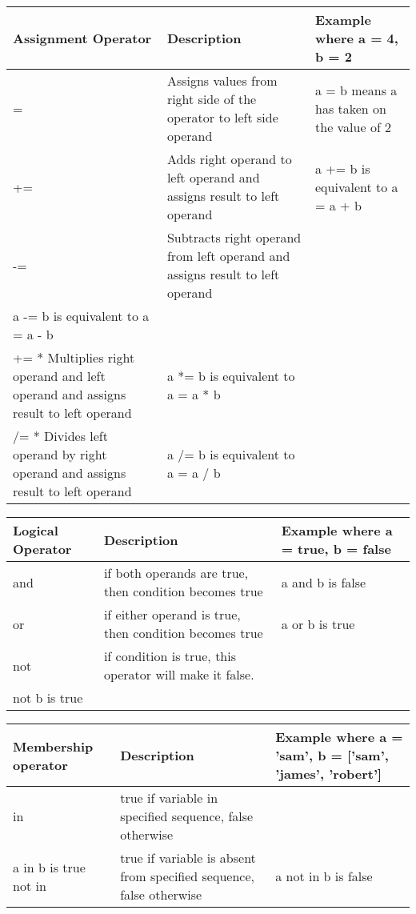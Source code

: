 \begin{center}
    \begin{tabular}{| l | l | l |}
    \hline
    Assignment Operator & Description & Example where a = 4, b = 2 \\ \hline
    = & Assigns values from right side of the operator to left side operand & a = b means a has taken on the value of 2 \\ \hline
    += & Adds right operand to left operand and assigns result to left operand & a += b is equivalent to a = a + b\\ \hline
    -= & Subtracts right operand from left operand and assigns result to left operand \\ a -= b is equivalent to a = a - b \\ \hline
    += * Multiplies right operand and left operand and assigns result to left operand & a *= b is equivalent to a = a * b\\ \hline
    /= * Divides left operand by right operand and assigns result to left operand & a /= b is equivalent to a = a / b\\ \hline
    \end{tabular}
\end{center}

\begin{center}
    \begin{tabular}{| l | l | l |}
    \hline
    Logical Operator & Description & Example where a = true, b = false \\ \hline
    and & if both operands are true, then condition becomes true & a and b is false \\ \hline
    or & if either operand is true, then condition becomes true & a or b is true\\ \hline
    not & if condition is true, this operator will make it false. \\ not b is true \\ \hline
    \end{tabular}
\end{center}

\begin{center}
    \begin{tabular}{| l | l | l |}
    \hline
   	Membership operator & Description & Example where a = 'sam', b = ['sam', 'james', 'robert'] \\ \hline
    in & true if variable in specified sequence, false otherwise &  \\ a in b is true \hline
    not in & true if variable is absent from specified sequence, false otherwise & a not in b is false\\ \hline
    \end{tabular}
\end{center}

